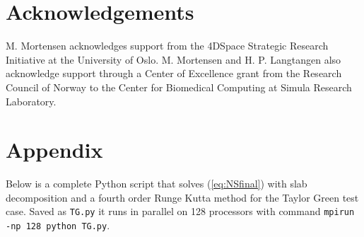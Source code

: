\documentclass[11pt, oneside]{article}
\newcommand{\inpyth}{\lstinline[style=pythonstyle, basicstyle=\ttfamily]} %[]%
\begin{document}
\section*{Acknowledgements}
M. Mortensen acknowledges support from the 4DSpace Strategic Research Initiative at the University of Oslo. M. Mortensen and H. P. Langtangen also acknowledge support through a Center of Excellence grant from the Research Council of Norway to the Center for Biomedical Computing at Simula Research Laboratory.



\newpage
\section*{Appendix}
\label{sec:appendix}
Below is a complete Python script that solves (\ref{eq:NSfinal}) with slab decomposition and a fourth order Runge Kutta method for the Taylor Green test case. Saved as \inpyth{TG.py} it runs in parallel on 128 processors with command \inpyth{mpirun -np 128 python TG.py}.
\end{document}
